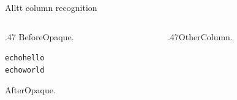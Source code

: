 \documentclass[aspectratio=169]{beamer}
\author{}
\date{}
\begin{document}
\begin{frame}[fragile]{Alltt column recognition}
\begin{columns}[T,totalwidth=\textwidth]
\begin{column}{.47\textwidth}
BeforeOpaque.
\begin{alltt}
  echo hello
  echo world
\end{alltt}
AfterOpaque.
\end{column}
\begin{column}{.47\textwidth}OtherColumn.\end{column}
\end{columns}
\end{frame}
\end{document}
